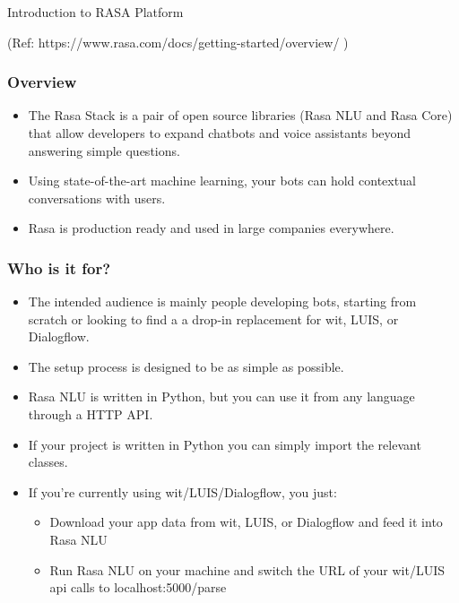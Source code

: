 \begin{frame}[fragile]\frametitle{}
\begin{center}
{\Large Introduction to RASA Platform}

{\tiny (Ref: https://www.rasa.com/docs/getting-started/overview/ )}
\end{center}
\end{frame}



 \begin{frame}[fragile]\frametitle{Overview}
\begin{itemize}
\item The Rasa Stack is a pair of open source libraries (Rasa NLU and Rasa Core) that allow developers to expand chatbots and voice assistants beyond answering simple questions. 
\item Using state-of-the-art machine learning, your bots can hold contextual conversations with users. 
\item Rasa is production ready and used in large companies everywhere.
\end{itemize}


\end{frame}


 \begin{frame}[fragile]\frametitle{Who is it for?}
\begin{itemize}
\item The intended audience is mainly people developing bots, starting from scratch or looking to find a a drop-in replacement for wit, LUIS, or Dialogflow. 
\item The setup process is designed to be as simple as possible. 
\item Rasa NLU is written in Python, but you can use it from any language through a HTTP API. 
\item If your project is written in Python you can simply import the relevant classes. 
\item If you're currently using wit/LUIS/Dialogflow, you just:
\begin{itemize}
\item Download your app data from wit, LUIS, or Dialogflow and feed it into Rasa NLU
\item Run Rasa NLU on your machine and switch the URL of your wit/LUIS api calls to localhost:5000/parse
\end{itemize}
\end{itemize}
\end{frame}


